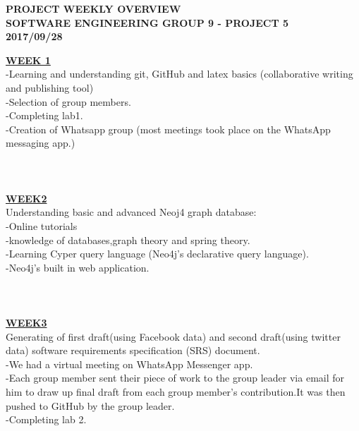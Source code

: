 \documentclass[12pt]{article}
\begin{document}
		\begin{titlepage}
		\begin{center}
		
		\huge\bfseries{PROJECT WEEKLY OVERVIEW}\\
	    \textsc{\Large SOFTWARE ENGINEERING GROUP 9 - PROJECT 5}\\
	    
	    \textsc{\Large 2017/09/28}\\
	    \end{center}
\end{titlepage}	

	
					\underline{\textbf{WEEK 1}}\\


  
-Learning and understanding git, GitHub and latex basics (collaborative writing and publishing tool)\\
-Selection of group members.\\
-Completing lab1.\\
-Creation of Whatsapp group (most meetings took place on the WhatsApp messaging app.)\\
  \\
  \\
  \\
						\underline{\textbf{WEEK2}}\\


Understanding basic and advanced Neoj4 graph database:\\
     -Online tutorials\\
     -knowledge of databases,graph theory and spring theory.\\
     -Learning Cyper query language (Neo4j's declarative query language).\\
     -Neo4j's built in web application.\\
     \\
     \\
     \\
						\underline{\textbf{WEEK3}}\\
						
						
Generating of first draft(using Facebook data) and second draft(using twitter data) software requirements specification (SRS) document.\\
-We had a virtual meeting on WhatsApp Messenger app.\\
-Each group member sent their piece of work to the group leader via email for him to draw up final draft from each group member's contribution.It was then pushed to GitHub by the group leader.\\
-Completing lab 2.\\
\end{document}
